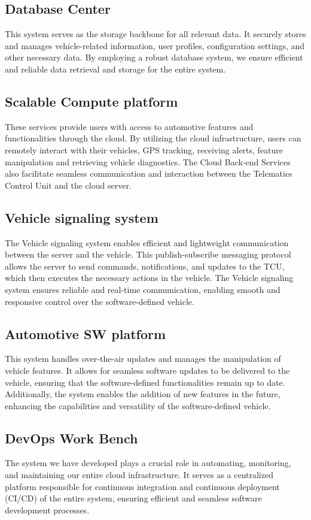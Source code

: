 \documentclass[
12pt,
oneside, 
onehalfspacing, 
nolistspacing, 
parskip, 
chapterinoneline, 
]{AASTCOMPUTER}
\begin{document}
\subsection{Database Center}
This system serves as the storage backbone for all relevant data. It securely stores and manages vehicle-related information, user profiles, configuration settings, and other necessary data. By employing a robust database system, we ensure efficient and reliable data retrieval and storage for the entire system.

\subsection{Scalable Compute platform}
These services provide users with access to automotive features and functionalities through the cloud. By utilizing the cloud infrastructure, users can remotely interact with their vehicles, GPS tracking, receiving alerts, feature manipulation and retrieving vehicle diagnostics. The Cloud Back-end Services also facilitate seamless communication and interaction between the Telematics Control Unit and the cloud server.

\subsection{Vehicle signaling system}
The Vehicle signaling system enables efficient and lightweight communication between the server and the vehicle. This publish-subscribe messaging protocol allows the server to send commands, notifications, and updates to the TCU, which then executes the necessary actions in the vehicle. The Vehicle signaling system ensures reliable and real-time communication, enabling smooth and responsive control over the software-defined vehicle.

\subsection{Automotive SW platform}
This system handles over-the-air updates and manages the manipulation of vehicle features. It allows for seamless software updates to be delivered to the vehicle, ensuring that the software-defined functionalities remain up to date. Additionally, the system enables the addition of new features in the future, enhancing the capabilities and versatility of the software-defined vehicle.
\newpage
\subsection{DevOps Work Bench}
The system we have developed plays a crucial role in automating, monitoring, and maintaining our entire cloud infrastructure. It serves as a centralized platform responsible for continuous integration and continuous deployment (CI/CD) of the entire system, ensuring efficient and seamless software development processes.
\end{document}
